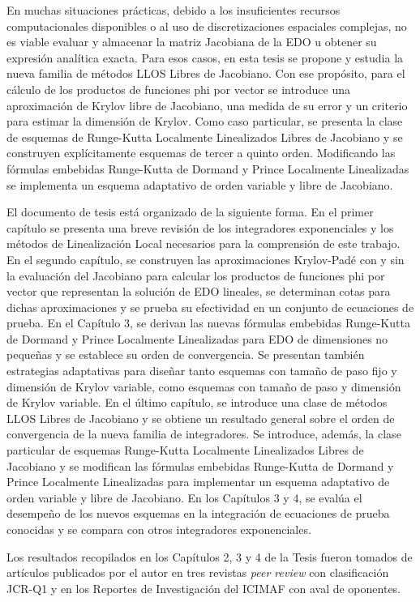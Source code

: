 En muchas situaciones prácticas, debido a los insuficientes recursos computacionales disponibles o al uso de discretizaciones espaciales complejas, no es viable evaluar y almacenar la matriz Jacobiana de la EDO u obtener su expresión analítica exacta. Para esos casos, en esta tesis se propone y estudia la nueva familia de métodos LLOS Libres de Jacobiano. Con ese propósito, para el cálculo de los productos de funciones phi por vector se introduce una aproximación de Krylov libre de Jacobiano, una medida de su error y un criterio para estimar la dimensión de Krylov. Como caso particular, se presenta la clase de esquemas de Runge-Kutta Localmente Linealizados Libres de Jacobiano y se construyen explícitamente esquemas de tercer a quinto orden. Modificando las fórmulas embebidas  Runge-Kutta de Dormand y Prince Localmente Linealizadas se implementa un esquema adaptativo de orden variable y libre de Jacobiano.

El documento de tesis está organizado de la siguiente forma. En el primer capítulo se presenta una breve revisión de los integradores exponenciales y los métodos de Linealización Local necesarios para la comprensión de este trabajo. En el segundo capítulo, se construyen las aproximaciones Krylov-Padé con y sin la evaluación del Jacobiano para calcular los productos de funciones phi por vector que representan la solución de EDO lineales, se determinan cotas para dichas aproximaciones y se prueba su efectividad en un conjunto de ecuaciones de prueba. En el Capítulo 3, se derivan las nuevas fórmulas embebidas Runge-Kutta de Dormand y Prince Localmente Linealizadas para EDO de dimensiones no pequeñas y se establece su orden de convergencia. Se presentan también estrategias adaptativas para diseñar tanto esquemas con tamaño de paso fijo y dimensión de Krylov variable, como esquemas con tamaño de paso y dimensión de Krylov variable. En el último capítulo, se introduce una clase de métodos LLOS Libres de Jacobiano y se obtiene un resultado general sobre el orden de convergencia de la nueva familia de integradores. Se introduce, además, la clase particular de esquemas Runge-Kutta Localmente Linealizados Libres de Jacobiano y se modifican las fórmulas embebidas Runge-Kutta  de Dormand y Prince Localmente Linealizadas para implementar un esquema adaptativo de orden variable y libre de Jacobiano.
En los Capítulos 3 y 4, se evalúa el desempeño de los nuevos esquemas en la integración de ecuaciones de prueba conocidas y se compara con otros integradores exponenciales.

Los resultados recopilados en los Capítulos 2, 3 y 4 de la Tesis fueron tomados de artículos \cite{naranjo2021locally,naranjo2023jacobian,naranjo2023computing} publicados por el autor en tres revistas \textit{peer review} con clasificación JCR-Q1 y en los Reportes de Investigación del ICIMAF \cite{naranjo2022RT,naranjo2023RT} con aval de oponentes.
